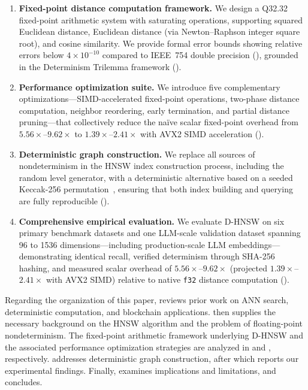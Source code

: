 \documentclass[10pt,journal]{IEEEtran}
\newcommand{\dhnsw}{\textsc{D-HNSW}}
\newcommand{\hnsw}{\textsc{HNSW}}
\begin{document}
\begin{enumerate}[leftmargin=*]
  \item \textbf{Fixed-point distance computation framework.} We design a Q32.32 fixed-point arithmetic system with saturating operations, supporting squared Euclidean distance, Euclidean distance (via Newton--Raphson integer square root), and cosine similarity. We provide formal error bounds showing relative errors below $4 \times 10^{-10}$ compared to IEEE~754 double precision (), grounded in the Determinism Trilemma framework ().

  \item \textbf{Performance optimization suite.} We introduce five complementary optimizations---SIMD-accelerated fixed-point operations, two-phase distance computation, neighbor reordering, early termination, and partial distance pruning---that collectively reduce the na\"ive scalar fixed-point overhead from $5.56\times$--$9.62\times$ to $1.39\times$--$2.41\times$ with AVX2 SIMD acceleration ().

  \item \textbf{Deterministic graph construction.} We replace all sources of nondeterminism in the \hnsw{} index construction process, including the random level generator, with a deterministic alternative based on a seeded Keccak-256 permutation~\cite{bertoni2013keccak}, ensuring that both index building and querying are fully reproducible ().

  \item \textbf{Comprehensive empirical evaluation.} We evaluate \dhnsw{} on six primary benchmark datasets and one LLM-scale validation dataset spanning 96 to 1536 dimensions---including production-scale LLM embeddings---demonstrating identical recall, verified determinism through SHA-256 hashing, and measured scalar overhead of $5.56\times$--$9.62\times$ (projected $1.39\times$--$2.41\times$ with AVX2 SIMD) relative to native \texttt{f32} distance computation ().
\end{enumerate}

Regarding the organization of this paper,  reviews prior work on ANN search, deterministic computation, and blockchain applications.  then supplies the necessary background on the \hnsw{} algorithm and the problem of floating-point nondeterminism. The fixed-point arithmetic framework underlying \dhnsw{} and the associated performance optimization strategies are analyzed in  and , respectively.  addresses deterministic graph construction, after which  reports our experimental findings. Finally,  examines implications and limitations, and  concludes.
\end{document}
